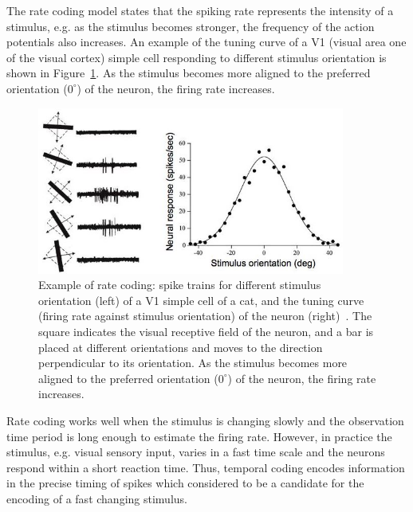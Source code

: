The rate coding model states that the spiking rate represents the intensity of a stimulus, e.g. as the stimulus becomes stronger, the frequency of the action potentials also increases.
An example of the tuning curve of a V1 (visual area one of the visual cortex) simple cell responding to different stimulus orientation is shown in Figure~\ref{Fig:v1}.
As the stimulus becomes more aligned to the preferred orientation ($0^\circ$) of the neuron, the firing rate increases.

\begin{figure}[bt]
	\centering
	\includegraphics[width=0.9\textwidth]{pics_snn/v1.jpg}
	\caption{Example of rate coding: spike trains for different stimulus orientation (left) of a V1 simple cell of a cat, and the tuning curve (firing rate against stimulus orientation) of the neuron (right)~\citep{hubel1962receptive}.
	The square indicates the visual receptive field of the neuron, and a bar is placed at different orientations and moves to the direction perpendicular to its orientation.
    As the stimulus becomes more aligned to the preferred orientation ($0^\circ$) of the neuron, the firing rate increases.}
	\label{Fig:v1}
\end{figure}

Rate coding works well when the stimulus is changing slowly and the observation time period is long enough to estimate the firing rate.
However, in practice the stimulus, e.g. visual sensory input, varies in a fast time scale and the neurons respond within a short reaction time.
Thus, temporal coding encodes information in the precise timing of spikes which considered to be a candidate for the encoding of a fast changing stimulus.

